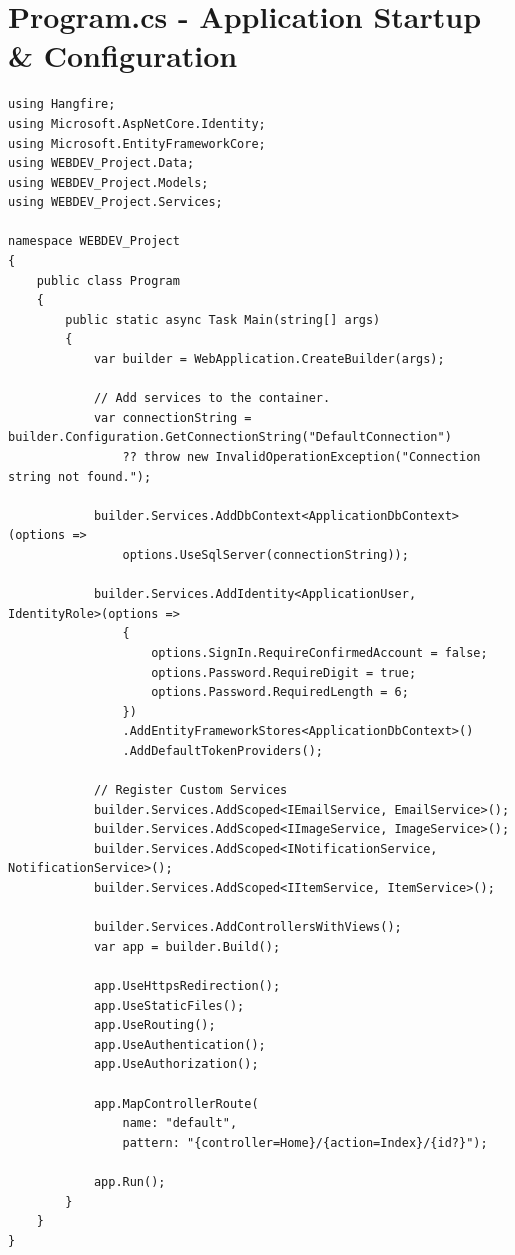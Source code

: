 \documentclass[12pt,a4paper]{report}
\begin{document}
\section{Program.cs - Application Startup \& Configuration}
\begin{lstlisting}[language={[Sharp]C}]
using Hangfire;
using Microsoft.AspNetCore.Identity;
using Microsoft.EntityFrameworkCore;
using WEBDEV_Project.Data;
using WEBDEV_Project.Models;
using WEBDEV_Project.Services;

namespace WEBDEV_Project
{
    public class Program
    {
        public static async Task Main(string[] args)
        {
            var builder = WebApplication.CreateBuilder(args);

            // Add services to the container.
            var connectionString = builder.Configuration.GetConnectionString("DefaultConnection") 
                ?? throw new InvalidOperationException("Connection string not found.");
            
            builder.Services.AddDbContext<ApplicationDbContext>(options =>
                options.UseSqlServer(connectionString));
                
            builder.Services.AddIdentity<ApplicationUser, IdentityRole>(options => 
                {
                    options.SignIn.RequireConfirmedAccount = false;
                    options.Password.RequireDigit = true;
                    options.Password.RequiredLength = 6;
                })
                .AddEntityFrameworkStores<ApplicationDbContext>()
                .AddDefaultTokenProviders();

            // Register Custom Services
            builder.Services.AddScoped<IEmailService, EmailService>();
            builder.Services.AddScoped<IImageService, ImageService>();
            builder.Services.AddScoped<INotificationService, NotificationService>();
            builder.Services.AddScoped<IItemService, ItemService>();

            builder.Services.AddControllersWithViews();
            var app = builder.Build();

            app.UseHttpsRedirection();
            app.UseStaticFiles();
            app.UseRouting();
            app.UseAuthentication();
            app.UseAuthorization();
            
            app.MapControllerRoute(
                name: "default",
                pattern: "{controller=Home}/{action=Index}/{id?}");

            app.Run();
        }
    }
}
\end{lstlisting}
\end{document}
